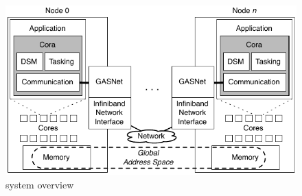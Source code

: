 \begin{figure}[t]
\begin{center}
  \includegraphics[width=0.95\columnwidth]{figs/system-overview}
\begin{minipage}{0.95\columnwidth}
  \caption{\label{fig:grappa} \Grappa system overview}
\end{minipage}
\vspace{-3ex}
\end{center}
\end{figure}

